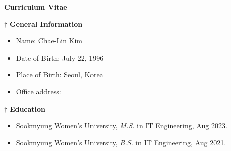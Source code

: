\newpage
\pagestyle{empty}
\begin{center}
    \huge \textbf{Curriculum Vitae}
\end{center}
\vspace*{0.5cm} \large{$\dagger$ \textbf{General Information}}
 \normalsize
 \begin{itemize}
    \item[\small\textbullet] \hspace*{-0.15cm} Name:         Chae-Lin Kim\vspace*{-0.2cm}
    \item[\small\textbullet] \hspace*{-0.15cm} Date of Birth: July 22, 1996 \vspace*{-0.2cm}
    \item[\small\textbullet] \hspace*{-0.15cm} Place of Birth: Seoul, Korea
    \vspace*{-0.2cm}
    \item[\small\textbullet] \hspace*{-0.15cm} Office address: \\
 \end{itemize}
 \vspace*{0.2cm} \large{$\dagger$ \textbf{Education}}
 \begin{center}
 \normalsize
\begin{itemize}
    \item[\small\textbullet]\hspace*{-0.15cm} Sookmyung Women's University, \textit{M.S.} in IT Engineering, Aug 2023.
    \item[\small\textbullet]\hspace*{-0.15cm} Sookmyung Women's University, \textit{B.S.} in IT Engineering, Aug 2021.
\end{itemize}
 \end{center}
